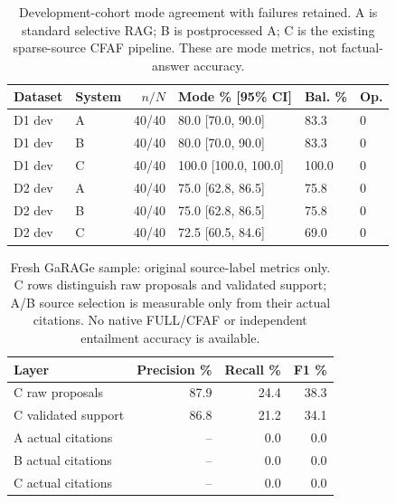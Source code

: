 \begin{table}[t]
\centering
\small
\caption{Development-cohort mode agreement with failures retained. A is standard selective RAG; B is postprocessed A; C is the existing sparse-source CFAF pipeline. These are mode metrics, not factual-answer accuracy.}
\label{tab:cfaf-contract-study-mode}
\begin{tabular}{llrlll}
\hline
Dataset & System & $n/N$ & Mode \% [95\% CI] & Bal. \% & Op. \\
\hline
D1 dev & A & 40/40 & 80.0 [70.0, 90.0] & 83.3 & 0 \\
D1 dev & B & 40/40 & 80.0 [70.0, 90.0] & 83.3 & 0 \\
D1 dev & C & 40/40 & 100.0 [100.0, 100.0] & 100.0 & 0 \\
D2 dev & A & 40/40 & 75.0 [62.8, 86.5] & 75.8 & 0 \\
D2 dev & B & 40/40 & 75.0 [62.8, 86.5] & 75.8 & 0 \\
D2 dev & C & 40/40 & 72.5 [60.5, 84.6] & 69.0 & 0 \\
\hline
\end{tabular}
\end{table}

\begin{table}[t]
\centering
\small
\caption{Fresh GaRAGe sample: original source-label metrics only. C rows distinguish raw proposals and validated support; A/B source selection is measurable only from their actual citations. No native FULL/CFAF or independent entailment accuracy is available.}
\label{tab:cfaf-contract-study-grounding}
\begin{tabular}{lrrr}
\hline
Layer & Precision \% & Recall \% & F1 \% \\
\hline
C raw proposals & 87.9 & 24.4 & 38.3 \\
C validated support & 86.8 & 21.2 & 34.1 \\
A actual citations & -- & 0.0 & 0.0 \\
B actual citations & -- & 0.0 & 0.0 \\
C actual citations & -- & 0.0 & 0.0 \\
\hline
\end{tabular}
\end{table}

